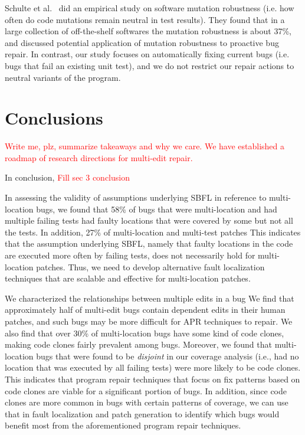 \documentclass[sigconf, timestamp-false, anonymous=true]{acmart}
\newcommand\todo[1]{\textcolor{red}{#1}}
\begin{document}
Schulte et al.~\cite{schulte} did an empirical study on software mutation robustness 
(i.e. how often do code mutations remain neutral in test results). 
They found that in a large collection of off-the-shelf softwares the mutation robustness is about 37\%, 
and discussed potential application of mutation robustness to proactive bug repair. 
In contrast, our study focuses on automatically fixing current bugs (i.e. bugs that fail an existing unit test), 
and we do not restrict our repair actions to neutral variants of the program.

\section{Conclusions}
\label{sec:conclusions}

\todo{Write me, plz, summarize takeaways and why we care.  We have established a
  roadmap of research directions for multi-edit repair.}

In conclusion, \todo{Fill sec 3 conclusion}

In assessing the validity of assumptions underlying SBFL in reference to multi-location 
bugs, we found that 58\% of bugs that were multi-location and had multiple failing tests 
had faulty locations 
that were covered by some but not all the tests. In addition, 27\% of multi-location and 
multi-test patches  This indicates that the assumption underlying SBFL, namely that faulty 
locations in the code are executed more often by failing tests, does not necessarily hold 
for multi-location patches. Thus, we need to develop alternative fault localization 
techniques that are scalable and effective for multi-location patches.

We characterized the relationships between multiple edits in a bug
We find that approximately half of multi-edit bugs 
contain dependent edits in their human patches, and such bugs may be more 
difficult for APR techniques to repair.
We also find that over 30\%
of multi-location bugs have some kind of code clones, making code clones fairly prevalent 
among bugs. Moreover, we found that multi-location bugs that were found to be 
\emph{disjoint} in our coverage analysis (i.e., had no location that was executed by all 
failing tests) were more likely to be code clones. This indicates that program repair 
techniques that focus on fix patterns based on code clones are viable for a significant 
portion of bugs. In addition, since code clones are more common in bugs with certain 
patterns of coverage, we can use that in fault localization and patch generation to identify 
which bugs would benefit most from the aforementioned program repair techniques.
\end{document}
